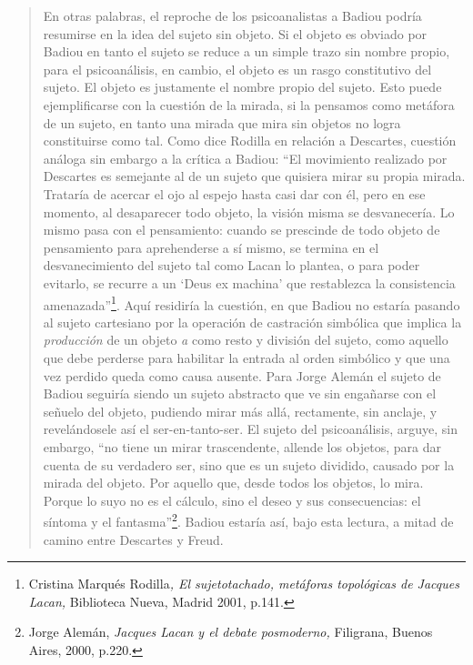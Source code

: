 \begin{quote}
En otras palabras, el reproche de los psicoanalistas a Badiou podría resumirse en la idea del sujeto sin objeto. Si el objeto es obviado por Badiou en tanto el sujeto se reduce a un simple trazo sin nombre propio, para el psicoanálisis, en cambio, el objeto es un rasgo constitutivo del sujeto. El objeto es justamente el nombre propio del sujeto. Esto puede ejemplificarse con la cuestión de la mirada, si la pensamos como metáfora de un sujeto, en tanto una mirada que mira sin objetos no logra constituirse como tal. Como dice Rodilla en relación a Descartes, cuestión análoga sin embargo a la crítica a Badiou: \enquote{El movimiento realizado por Descartes es semejante al de un sujeto que quisiera mirar su propia mirada. Trataría de acercar el ojo al espejo hasta casi dar con él, pero en ese momento, al desaparecer todo objeto, la visión misma se desvanecería. Lo mismo pasa con el pensamiento: cuando se prescinde de todo objeto de pensamiento para aprehenderse a sí mismo, se termina en el desvanecimiento del sujeto tal como Lacan lo plantea, o para poder evitarlo, se recurre a un \enquote{Deus ex machina} que restablezca la consistencia amenazada}\footnote{Cristina Marqués Rodilla\emph{, El sujetotachado, metáforas topológicas de Jacques Lacan,} Biblioteca Nueva, Madrid 2001, p.141.}. Aquí residiría la cuestión, en que Badiou no estaría pasando al sujeto cartesiano por la operación de castración simbólica que implica la \emph{producción} de un objeto \emph{a} como resto y división del sujeto, como aquello que debe perderse para habilitar la entrada al orden simbólico y que una vez perdido queda como causa ausente. Para Jorge Alemán el sujeto de Badiou seguiría siendo un sujeto abstracto que ve sin engañarse con el señuelo del objeto, pudiendo mirar más allá, rectamente, sin anclaje, y revelándosele así el ser-en-tanto-ser. El sujeto del psicoanálisis, arguye, sin embargo, \enquote{no tiene un mirar trascendente, allende los objetos, para dar cuenta de su verdadero ser, sino que es un sujeto dividido, causado por la mirada del objeto. Por aquello que, desde todos los objetos, lo mira. Porque lo suyo no es el cálculo, sino el deseo y sus consecuencias: el síntoma y el fantasma}\footnote{Jorge Alemán, \emph{Jacques Lacan y el debate posmoderno,} Filigrana, Buenos Aires, 2000, p.220.}. Badiou estaría así, bajo esta lectura, a mitad de camino entre Descartes y Freud.


\end{quote}
